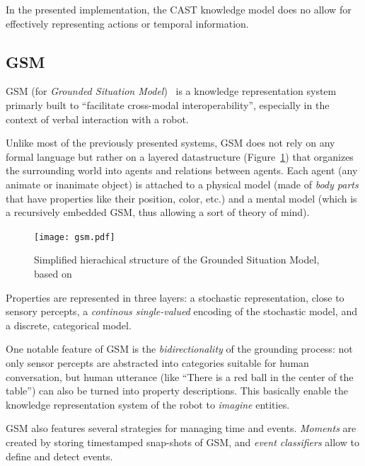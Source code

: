 \documentclass[a4paper, twocolumn]{article}
\begin{document}
In the presented implementation, the CAST knowledge model does no allow for
effectively representing actions or temporal information.

\subsection{GSM}
\label{sect|gsm}

GSM (for \emph{Grounded Situation Model})~\cite{Mavridis2006} is a knowledge
representation system primarly built to ``facilitate cross-modal
interoperability'',  especially in the context of verbal interaction with a
robot.

Unlike most of the previously presented systems, GSM does not rely on any
formal language but rather on a layered datastructure (Figure~\ref{fig|gsm})
that organizes the surrounding world into agents and relations between agents.
Each agent (any animate or inanimate object) is attached to a physical model (made
of \emph{body parts} that have properties like their position, color, etc.) and
a mental model (which is a recursively embedded GSM, thus allowing a sort of
theory of mind).

\begin{figure}
    \centering
    \texttt{[image: gsm.pdf]}

    \caption{Simplified hierachical structure of the Grounded Situation Model,
    based on~\cite{Mavridis2006}}

    \label{fig|gsm}
\end{figure}

Properties are represented in three layers: a stochastic representation, close
to sensory percepts, a \emph{continous single-valued} encoding of the
stochastic model, and a discrete, categorical model.

One notable feature of GSM is the \emph{bidirectionality} of the grounding
process: not only sensor percepts are abstracted into categories suitable for
human conversation, but human utterance (like ``There is a red ball in the
center of the table'') can also be turned into property descriptions. This
basically enable the knowledge representation system of the robot to
\emph{imagine} entities.

GSM also features several strategies for managing time and events.
\emph{Moments} are created by storing timestamped snap-shots of GSM, and
\emph{event classifiers} allow to define and detect events.
\end{document}

